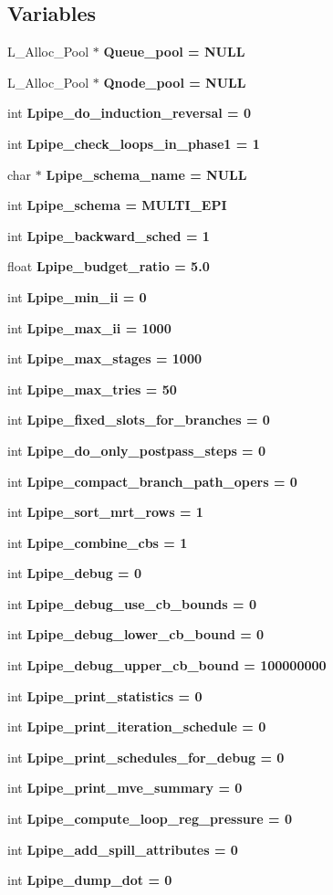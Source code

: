 \subsection*{Variables}
\begin{CompactItemize}
\item 
L\_\-Alloc\_\-Pool $\ast$ \bf{Queue\_\-pool} = NULL
\item 
L\_\-Alloc\_\-Pool $\ast$ \bf{Qnode\_\-pool} = NULL
\item 
int \bf{Lpipe\_\-do\_\-induction\_\-reversal} = 0
\item 
int \bf{Lpipe\_\-check\_\-loops\_\-in\_\-phase1} = 1
\item 
char $\ast$ \bf{Lpipe\_\-schema\_\-name} = NULL
\item 
int \bf{Lpipe\_\-schema} = MULTI\_\-EPI
\item 
int \bf{Lpipe\_\-backward\_\-sched} = 1
\item 
float \bf{Lpipe\_\-budget\_\-ratio} = 5.0
\item 
int \bf{Lpipe\_\-min\_\-ii} = 0
\item 
int \bf{Lpipe\_\-max\_\-ii} = 1000
\item 
int \bf{Lpipe\_\-max\_\-stages} = 1000
\item 
int \bf{Lpipe\_\-max\_\-tries} = 50
\item 
int \bf{Lpipe\_\-fixed\_\-slots\_\-for\_\-branches} = 0
\item 
int \bf{Lpipe\_\-do\_\-only\_\-postpass\_\-steps} = 0
\item 
int \bf{Lpipe\_\-compact\_\-branch\_\-path\_\-opers} = 0
\item 
int \bf{Lpipe\_\-sort\_\-mrt\_\-rows} = 1
\item 
int \bf{Lpipe\_\-combine\_\-cbs} = 1
\item 
int \bf{Lpipe\_\-debug} = 0
\item 
int \bf{Lpipe\_\-debug\_\-use\_\-cb\_\-bounds} = 0
\item 
int \bf{Lpipe\_\-debug\_\-lower\_\-cb\_\-bound} = 0
\item 
int \bf{Lpipe\_\-debug\_\-upper\_\-cb\_\-bound} = 100000000
\item 
int \bf{Lpipe\_\-print\_\-statistics} = 0
\item 
int \bf{Lpipe\_\-print\_\-iteration\_\-schedule} = 0
\item 
int \bf{Lpipe\_\-print\_\-schedules\_\-for\_\-debug} = 0
\item 
int \bf{Lpipe\_\-print\_\-mve\_\-summary} = 0
\item 
int \bf{Lpipe\_\-compute\_\-loop\_\-reg\_\-pressure} = 0
\item 
int \bf{Lpipe\_\-add\_\-spill\_\-attributes} = 0
\item 
int \bf{Lpipe\_\-dump\_\-dot} = 0
\end{CompactItemize}


